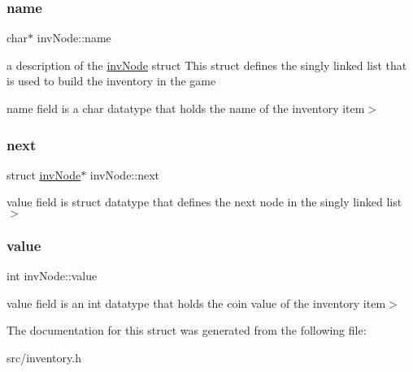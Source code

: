 \subsubsection{\texorpdfstring{name}{name}}
{\footnotesize\ttfamily char$\ast$ inv\+Node\+::name}



a description of the \mbox{\hyperlink{structinvNode}{inv\+Node}} struct This struct defines the singly linked list that is used to build the inventory in the game 

name field is a char datatype that holds the name of the inventory item$>$ \mbox{\label{structinvNode_a261fbbb63377c455aebbe3125a094f2a}} 
\subsubsection{\texorpdfstring{next}{next}}
{\footnotesize\ttfamily struct \mbox{\hyperlink{structinvNode}{inv\+Node}}$\ast$ inv\+Node\+::next}

value field is struct datatype that defines the next node in the singly linked list$>$ \mbox{\label{structinvNode_a09ea57682fef12ccee24772ab4fa539c}} 
\subsubsection{\texorpdfstring{value}{value}}
{\footnotesize\ttfamily int inv\+Node\+::value}

value field is an int datatype that holds the coin value of the inventory item$>$ 

The documentation for this struct was generated from the following file\+:\begin{DoxyCompactItemize}
\item 
src/inventory.\+h\end{DoxyCompactItemize}
